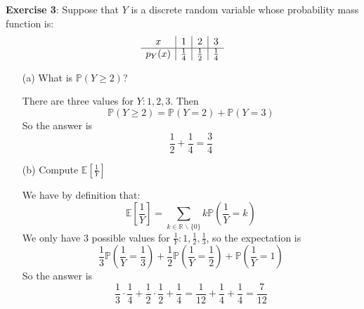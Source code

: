 \documentclass{article}
\begin{document}
\textbf{Exercise 3}: Suppose that $Y$ is a discrete random variable whose probability mass function is:
    \begin{align*}
        \begin{array}{ c | c | c | c }
            x        & 1            & 2            & 3            \\
            \hline
            p_{Y}(x) & \frac{1}{4} & \frac{1}{2} & \frac{1}{4}   
        \end{array}
    \end{align*}
\begin{itemize}
    \item [(a)] What is $\mathbb{P}(Y \geq 2)$?
        \begin{answer}
            There are three values for $Y: 1, 2, 3$. Then 
                \begin{equation*}
                    \mathbb{P}(Y \geq 2) = \mathbb{P}(Y = 2) + \mathbb{P}(Y = 3)
                \end{equation*}
            So the answer is
                \begin{equation*}
                    \dfrac{1}{2} + \dfrac{1}{4} = \dfrac{3}{4}
                \end{equation*}
        \end{answer}

    \item [(b)] Compute $\mathbb{E}[\frac{1}{Y}]$ 
        \begin{answer}
            We have by definition that:
                \begin{equation*}
                    \mathbb{E}\left[\dfrac{1}{Y}\right] = \sum_{k \in \mathbb{R} \backslash \{0\}}k\mathbb{P}\left(\dfrac{1}{Y} = k\right)
                \end{equation*}
            We only have $3$ possible values for $\frac{1}{Y}: 1, \frac{1}{2}, \frac{1}{3}$, so the expectation is
                \begin{equation*}
                    \dfrac{1}{3}\mathbb{P}\left(\dfrac{1}{Y} = \dfrac{1}{3}\right) + \dfrac{1}{2} \mathbb{P}\left(\dfrac{1}{Y} = \dfrac{1}{2}\right) + \mathbb{P}\left(\dfrac{1}{Y} = 1\right)
                \end{equation*}
            So the answer is 
                \begin{equation*}
                    \dfrac{1}{3} \cdot \dfrac{1}{4} + \dfrac{1}{2} \cdot \dfrac{1}{2} + \dfrac{1}{4} = \dfrac{1}{12} + \dfrac{1}{4} + \dfrac{1}{4}  = \dfrac{7}{12}
                \end{equation*}
        \end{answer}
\end{itemize}
\end{document}
